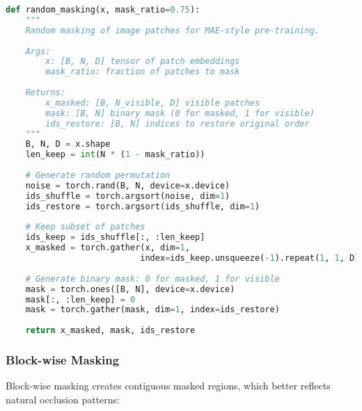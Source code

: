 \begin{lstlisting}[language=Python, caption=Random masking implementation for vision transformers]
def random_masking(x, mask_ratio=0.75):
    """
    Random masking of image patches for MAE-style pre-training.
    
    Args:
        x: [B, N, D] tensor of patch embeddings
        mask_ratio: fraction of patches to mask
    
    Returns:
        x_masked: [B, N_visible, D] visible patches
        mask: [B, N] binary mask (0 for masked, 1 for visible)
        ids_restore: [B, N] indices to restore original order
    """
    B, N, D = x.shape
    len_keep = int(N * (1 - mask_ratio))
    
    # Generate random permutation
    noise = torch.rand(B, N, device=x.device)
    ids_shuffle = torch.argsort(noise, dim=1)
    ids_restore = torch.argsort(ids_shuffle, dim=1)
    
    # Keep subset of patches
    ids_keep = ids_shuffle[:, :len_keep]
    x_masked = torch.gather(x, dim=1, 
                           index=ids_keep.unsqueeze(-1).repeat(1, 1, D))
    
    # Generate binary mask: 0 for masked, 1 for visible
    mask = torch.ones([B, N], device=x.device)
    mask[:, :len_keep] = 0
    mask = torch.gather(mask, dim=1, index=ids_restore)
    
    return x_masked, mask, ids_restore
\end{lstlisting}

\subsubsection{Block-wise Masking}

Block-wise masking creates contiguous masked regions, which better reflects natural occlusion patterns:

